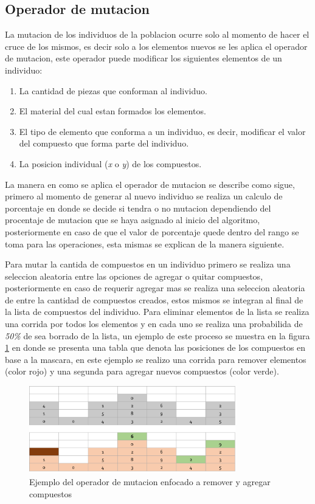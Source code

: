 \subsection{Operador de mutacion}
\label{subsection:mutation_operator}

La mutacion de los individuos de la poblacion ocurre solo al momento de hacer el
cruce de los mismos, es decir solo a los elementos nuevos se les aplica el
operador de mutacion, este operador puede modificar los siguientes elementos de
un individuo:
\begin{enumerate}
  \item La cantidad de piezas que conforman al individuo.
  \item El material del cual estan formados los elementos.
  \item El tipo de elemento que conforma a un individuo, es decir, modificar el
  valor del compuesto que forma parte del individuo.
  \item La posicion individual (\textit{x} o \textit{y}) de los compuestos.
\end{enumerate}

La manera en como se aplica el operador de mutacion se describe como sigue,
primero al momento de generar al nuevo individuo se realiza un calculo de
porcentaje en donde se decide si tendra o no mutacion dependiendo del procentaje
de mutacion que se haya asignado al inicio del algoritmo, posteriormente en caso
de que el valor de porcentaje quede dentro del rango se toma para las
operaciones, esta mismas se explican de la manera siguiente.

Para mutar la cantida de compuestos en un individuo primero se realiza una
seleccion aleatoria entre las opciones de agregar o quitar compuestos,
posteriormente en caso de requerir agregar mas se realiza una seleccion
aleatoria de entre la cantidad de compuestos creados, estos mismos se integran
al final de la lista de compuestos del individuo. Para eliminar elementos de la
lista se realiza una corrida por todos los elementos y en cada uno se realiza
una probabilida de \textit{50\%} de sea borrado de la lista, un ejemplo de este
proceso se muestra en la figura \ref{figure:mutate_add_remove} en donde se
presenta una tabla que denota las posiciones de los compuestos en base a la
mascara, en este ejemplo se realizo una corrida para remover elementos (color
rojo) y una segunda para agregar nuevos compuestos (color verde).

\begin{figure}
  \centering
  \includegraphics[width=0.8\textwidth]{img/mutation_add_remove.png}
  \caption{Ejemplo del operador de mutacion enfocado a remover y agregar compuestos}
  \label{figure:mutate_add_remove}
\end{figure}

